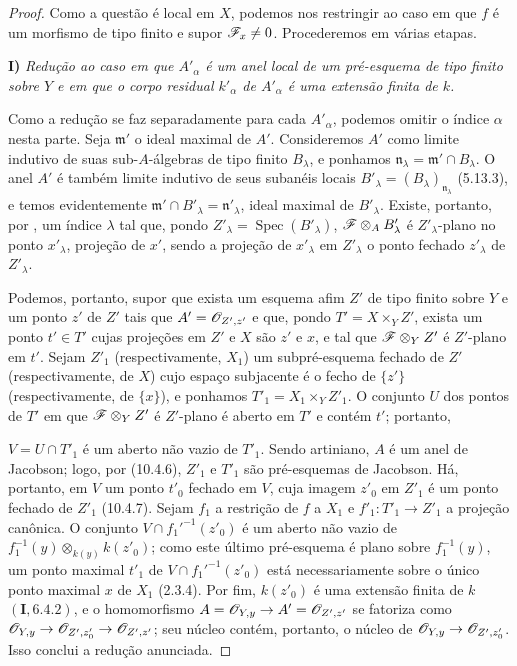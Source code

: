 \begin{proof}
Como a questão é local em
$X$, podemos nos restringir
ao caso em que $f$ é um
morfismo de tipo finito e
supor $\mathscr{F}_x\neq0$.
Procederemos em várias
etapas.

\medskip
\noindent\textbf{I)}
\emph{Redução ao caso em
que $A'_\alpha$ é um anel
local de um pré-esquema de
tipo finito sobre $Y$ e
em que o corpo residual
$k'_\alpha$ de
$A'_\alpha$ é uma extensão
finita de $k$.}

\medskip
Como a redução se faz
separadamente para cada
$A'_\alpha$, podemos
omitir o índice $\alpha$
nesta parte. Seja
$\mathfrak m'$ o ideal
maximal de $A'$.
Consideremos $A'$ como
limite indutivo de suas
sub-$A$-álgebras de tipo
finito $B_\lambda$, e
ponhamos
$\mathfrak n_\lambda=
\mathfrak m'\cap B_\lambda$.
O anel $A'$ é também limite
indutivo de seus subanéis
locais
$B'_\lambda=
(B_\lambda)_{\mathfrak n_\lambda}$
(5.13.3), e temos
evidentemente
$\mathfrak m'\cap B'_\lambda
=\mathfrak n'_\lambda$,
ideal maximal de
$B'_\lambda$.
Existe, portanto, por
, um
índice $\lambda$ tal que,
pondo
$Z'_\lambda=
\operatorname{Spec}(B'_\lambda)$,
$\mathscr{F}\otimes_A B'_\lambda$
é $Z'_\lambda$-plano no
ponto $x'_\lambda$,
projeção de $x'$, sendo
a projeção de
$x'_\lambda$ em
$Z'_\lambda$ o ponto
fechado $z'_\lambda$
de $Z'_\lambda$.

Podemos, portanto, supor
que exista um esquema afim
$Z'$ de tipo finito sobre
$Y$ e um ponto $z'$ de
$Z'$ tais que
$A'=\mathscr{O}_{Z',z'}$ e
que, pondo
$T'=X\times_Y Z'$,
exista um ponto
$t'\in T'$ cujas projeções
em $Z'$ e $X$ são $z'$
e $x$, e tal que
$\mathscr{F}\otimes_Y Z'$
é $Z'$-plano em $t'$.
Sejam $Z'_1$
(respectivamente, $X_1$)
um subpré-esquema fechado
de $Z'$ (respectivamente,
de $X$) cujo espaço
subjacente é o fecho de
$\{z'\}$
(respectivamente, de
$\{x\}$), e ponhamos
$T'_1=X_1\times_Y Z'_1$.
O conjunto $U$ dos pontos
de $T'$ em que
$\mathscr{F}\otimes_Y Z'$
é $Z'$-plano é aberto em
$T'$  e
contém $t'$; portanto,


$V=U\cap T'_1$ é um
aberto não vazio de
$T'_1$. Sendo artiniano,
$A$ é um anel de Jacobson;
logo, por
(10.4.6),
$Z'_1$ e $T'_1$ são
pré-esquemas de Jacobson.
Há, portanto, em $V$ um
ponto $t'_0$ fechado em
$V$, cuja imagem $z'_0$
em $Z'_1$ é um ponto
fechado de $Z'_1$
(10.4.7).
Sejam $f_1$ a restrição
de $f$ a $X_1$ e
$f'_1:T'_1\to Z'_1$ a
projeção canônica.
O conjunto
$V\cap f_1'^{-1}(z'_0)$
é um aberto não vazio de
$f_1^{-1}(y)\otimes_{k(y)}
k(z'_0)$; como este
último pré-esquema é
plano sobre
$f_1^{-1}(y)$, um ponto
maximal $t'_1$ de
$V\cap f_1'^{-1}(z'_0)$
está necessariamente
sobre o único ponto
maximal $x$ de $X_1$
(2.3.4).
Por fim, $k(z'_0)$ é
uma extensão finita
de $k$ $(\mathbf I,6.4.2)$,
e o homomorfismo
$A=\sh{O}_{Y,y}\to
A'=\sh{O}_{Z',z'}$
se fatoriza como
$\sh{O}_{Y,y}\to
\sh{O}_{Z',z'_0}\to
\sh{O}_{Z',z'}$;
seu núcleo contém,
portanto, o núcleo de
$\sh{O}_{Y,y}\to
\sh{O}_{Z',z'_0}$.
Isso conclui a redução
anunciada.


\end{proof}
